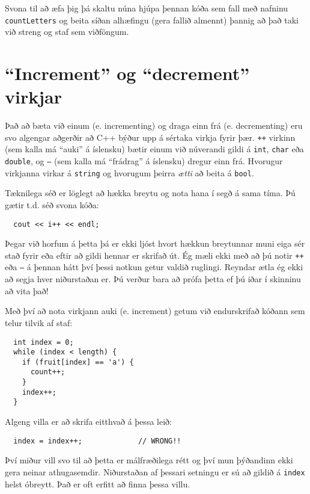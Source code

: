 
Svona til að æfa þig þá skaltu núna hjúpa þennan kóða sem fall með nafninu {\tt countLetters} og beita síðan alhæfingu (gera fallið almennt)
þannig að það taki við streng og staf sem viðföngum.



\section{``Increment'' og ``decrement'' virkjar}

Það að bæta við einum (e. incrementing) og draga einn frá (e. decrementing) eru svo algengar aðgerðir að C++ býður upp á sértaka virkja fyrir þær.
{\tt ++} virkinn (sem kalla má ``auki'' á íslensku) bætir einum við núverandi gildi á {\tt int}, {\tt char} eða {\tt double}, og
{\tt --} (sem kalla má ``frádrag'' á íslensku) dregur einn frá.
Hvorugur virkjanna virkar á {\tt string} og hvorugum þeirra {\em ætti} að beita á {\tt bool}.

Tæknilega séð er löglegt að hækka breytu og nota hana í segð á sama tíma.
Þú gætir t.d. séð svona kóða: 

\begin{verbatim}
  cout << i++ << endl;
\end{verbatim}
%
Þegar við horfum á þetta þá er ekki ljóst hvort hækkun breytunnar muni eiga sér stað fyrir eða eftir að gildi hennar er skrifað út.
Ég mæli ekki með að þú notir {\tt ++} eða {\tt --} á þennan hátt því þessi notkun getur valdið ruglingi.
Reyndar ætla ég ekki að segja hver niðurstaðan er.  
Þú verður bara að prófa þetta ef þú iðar í skinninu að vita það!

Með því að nota virkjann auki (e. increment) getum við endurskrifað kóðann sem telur tilvik af staf:

\begin{verbatim}
  int index = 0;
  while (index < length) {
    if (fruit[index] == 'a') {
      count++;
    }
    index++;
  }
\end{verbatim}
%
Algeng villa er að skrifa eitthvað á þessa leið:

\begin{verbatim}
  index = index++;             // WRONG!!
\end{verbatim}
%
Því miður vill svo til að þetta er málfræðilega rétt og því mun þýðandinn ekki gera neinar athugasemdir.
Niðurstaðan af þessari setningu er sú að gildið á {\tt index} helst óbreytt.
Það er oft erfitt að finna þessa villu.


